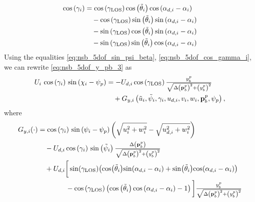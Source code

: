 \begin{equation}
    \begin{split}
    \cos\left(\gamma_i\right) &= \cos\left(\gamma_{\rm LOS}\right)\cos\left(\tilde{\theta}_i\right)\cos\left(\alpha_{d,i} - \alpha_i\right) \\
        &\quad - \cos\left(\gamma_{\rm LOS}\right)\sin\left(\tilde{\theta}_i\right)\sin\left(\alpha_{d,i} - \alpha_i\right) \\
        & \quad - \sin\left(\gamma_{\rm LOS}\right)\cos\left(\tilde{\theta}_i\right)\sin\left(\alpha_{d,i} - \alpha_i\right) \\
        & \quad - \sin\left(\gamma_{\rm LOS}\right)\sin\left(\tilde{\theta}_i\right)\cos\left(\alpha_{d,i} - \alpha_i\right)
    \end{split}
    \label{eq:nsb_5dof_cos_gamma_i}
\end{equation}
Using the equalities \eqref{eq:nsb_5dof_sin_psi_beta}, \eqref{eq:nsb_5dof_cos_gamma_i}, we can rewrite \eqref{eq:nsb_5dof_y_pb_3} as
\begin{equation}
    \begin{split}
        U_i\,\cos\left(\gamma_i\right)\,\sin\left(\chi_i - \psi_p\right) &= - U_{d,i}\cos\left(\gamma_{\rm LOS}\right)\scale[1]{\frac{y_b^p}{\sqrt{\Delta\left(\mat{p}_b^p\right)^2 + \left(y_b^p\right)^2}}} \\
        & \quad + G_{y,i}\left(\tilde{u}_i, \tilde{\psi}_i, \gamma_i, u_{d,i}, v_i, w_i, \mat{p}_b^p, \psi_p\right),
    \end{split}
    \label{eq:nsb_5dof_y_pb_4}
\end{equation}
where
\begin{equation}
    \begin{split}
        G_{y,i}(\cdot) &= \cos\left(\gamma_i\right)\,\sin\left(\psi_i - \psi_p\right)\left(\sqrt{u_i^2 + w_i^2} - \sqrt{u_{d,i}^2 + w_i^2}\right) \\
        &\quad - U_{d,i}\cos\left(\gamma_i\right)\,\sin\left(\tilde{\psi}_i\right)\scale[1]{\frac{\Delta\left(\mat{p}_b^p\right)}{\sqrt{\Delta\left(\mat{p}_b^p\right)^2 + \left(y_b^p\right)^2}}} \\
        &\quad + U_{d,i}\bigg[\sin\!\left(\gamma_{\rm LOS}\right)\!\left(\cos\!\left(\tilde{\theta}_i\right)\!\sin\!\left(\alpha_{d,i} - \alpha_i\right) + \sin\!\left(\tilde{\theta}_i\right)\!\cos\!\left(\alpha_{d,i} - \alpha_i\right)\right) \\
        & \qquad \qquad -\cos\left(\gamma_{\rm LOS}\right)\left(\cos\left(\tilde{\theta}_i\right)\cos\left(\alpha_{d,i} - \alpha_i\right) - 1\right)\bigg]\scale[1]{\frac{y_b^p}{\sqrt{\Delta\left(\mat{p}_b^p\right)^2 + \left(y_b^p\right)^2}}} 
    \end{split} \label{eq:nsb_5dof_G_y}
\end{equation}

